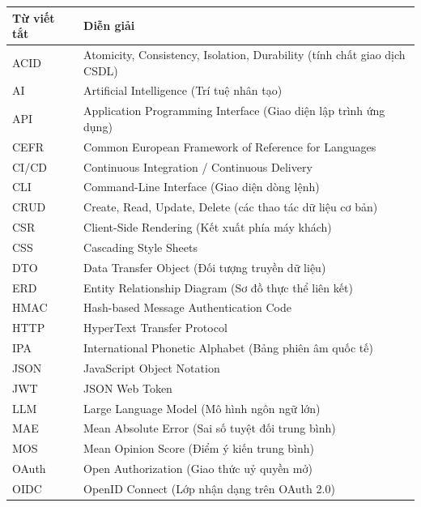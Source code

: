 \documentclass[12pt,a4paper,oneside]{report}
\begin{document}
\begin{table}[h]
  \centering
  \renewcommand{\arraystretch}{1.3}
  \begin{tabular}{|l|l|}
    \hline
    \textbf{Từ viết tắt} & \textbf{Diễn giải} \\
    \hline
    ACID  & Atomicity, Consistency, Isolation, Durability (tính chất giao dịch CSDL) \\
    \hline
    AI    & Artificial Intelligence (Trí tuệ nhân tạo) \\
    \hline
    API   & Application Programming Interface (Giao diện lập trình ứng dụng) \\
    \hline
    CEFR  & Common European Framework of Reference for Languages \\
    \hline
    CI/CD & Continuous Integration / Continuous Delivery \\
    \hline
    CLI   & Command-Line Interface (Giao diện dòng lệnh) \\
    \hline
    CRUD  & Create, Read, Update, Delete (các thao tác dữ liệu cơ bản) \\
    \hline
    CSR   & Client-Side Rendering (Kết xuất phía máy khách) \\
    \hline
    CSS   & Cascading Style Sheets \\
    \hline
    DTO   & Data Transfer Object (Đối tượng truyền dữ liệu) \\
    \hline
    ERD   & Entity Relationship Diagram (Sơ đồ thực thể liên kết) \\
    \hline
    HMAC  & Hash-based Message Authentication Code \\
    \hline
    HTTP  & HyperText Transfer Protocol \\
    \hline
    IPA   & International Phonetic Alphabet (Bảng phiên âm quốc tế) \\
    \hline
    JSON  & JavaScript Object Notation \\
    \hline
    JWT   & JSON Web Token \\
    \hline
    LLM   & Large Language Model (Mô hình ngôn ngữ lớn) \\
    \hline
    MAE   & Mean Absolute Error (Sai số tuyệt đối trung bình) \\
    \hline
    MOS   & Mean Opinion Score (Điểm ý kiến trung bình) \\
    \hline
    OAuth & Open Authorization (Giao thức uỷ quyền mở) \\
    \hline
    OIDC  & OpenID Connect (Lớp nhận dạng trên OAuth 2.0) \\

\end{tabular}
\end{table}
\end{document}
